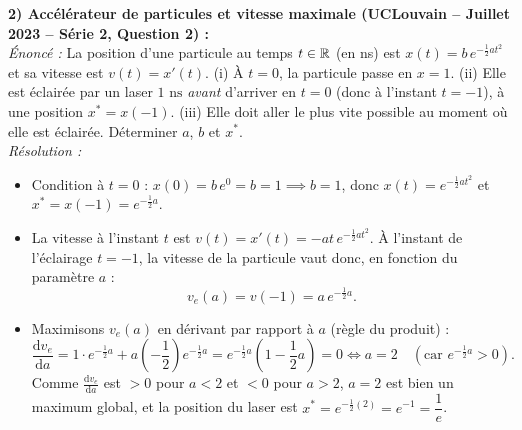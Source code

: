 \begin{exemple}
\medskip
\textbf{2) Accélérateur de particules et vitesse maximale (UCLouvain -- Juillet 2023 -- Série 2, Question 2) :}\\
\emph{Énoncé :} La position d'une particule au temps $t \in \mathbb{R}$ (en ns) est $x(t) = b\,e^{-\frac{1}{2}at^2}$ et sa vitesse est $v(t) = x'(t)$.
(i) À $t = 0$, la particule passe en $x = 1$.
(ii) Elle est éclairée par un laser $1\text{ ns}$ \emph{avant} d'arriver en $t = 0$ (donc à l'instant $t = -1$), à une position $x^* = x(-1)$.
(iii) Elle doit aller le plus vite possible au moment où elle est éclairée. Déterminer $a$, $b$ et $x^*$.\\
\emph{Résolution :}
\begin{itemize}
    \item Condition à $t = 0$ : $x(0) = b\,e^0 = b = 1 \implies \boxed{b = 1}$, donc $x(t) = e^{-\frac{1}{2}at^2}$ et $x^* = x(-1) = e^{-\frac{1}{2}a}$.
    \item La vitesse à l'instant $t$ est $v(t) = x'(t) = -at\,e^{-\frac{1}{2}at^2}$. À l'instant de l'éclairage $t = -1$, la vitesse de la particule vaut donc, en fonction du paramètre $a$ :
    \[
        v_e(a) = v(-1) = a\,e^{-\frac{1}{2}a}.
    \]
    \item Maximisons $v_e(a)$ en dérivant par rapport à $a$ (règle du produit) :
    \[
        \frac{\mathrm{d}v_e}{\mathrm{d}a} = 1\cdot e^{-\frac{1}{2}a} + a\left(-\frac{1}{2}\right)e^{-\frac{1}{2}a} = e^{-\frac{1}{2}a}\left(1 - \frac{1}{2}a\right) = 0 \iff \boxed{a = 2} \quad (\text{car } e^{-\frac{1}{2}a} > 0).
    \]
    Comme $\frac{\mathrm{d}v_e}{\mathrm{d}a}$ est $> 0$ pour $a < 2$ et $< 0$ pour $a > 2$, $a = 2$ est bien un maximum global, et la position du laser est $\boxed{x^* = e^{-\frac{1}{2}(2)} = e^{-1} = \dfrac{1}{e}}$.
\end{itemize}


\end{exemple}
